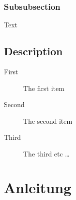 \documentclass[a4,12pt]{scrartcl}
\begin{document}
\subsubsection{Subsubsection}
Text

\subsection{Description}
\begin{description}
  \item[First] The first item
  \item[Second] The second item
  \item[Third] The third etc \ldots
\end{description}

\section{Anleitung}
\newpage
\end{document}
